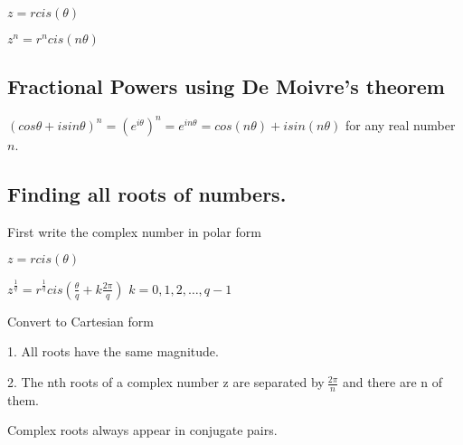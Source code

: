 \documentclass{extarticle}
\begin{document}
\begin{multicols}{4}
$z=rcis\left(\theta\right)$

$z^n=r^ncis\left(n\theta\right)$


\subsection{Fractional Powers using De Moivre's theorem}

$\left(cos\theta+isin\theta\right)^n=\left(e^{i\theta}\right)^n=e^{in\theta}=cos\left(n\theta\right)+isin\left(n\theta\right)$
for any real number $n$.


\subsection{Finding all roots of numbers.}

First write the complex number in polar form

$z=rcis\left(\theta\right)$


$z^\frac{1}{q}=r^\frac{1}{q}cis\left(\frac{\theta}{q}+k\frac{2\pi}{q}\right)$ $k=0,1,2,\ldots,q-1$

Convert to Cartesian form

1. All roots have the same magnitude.

2. The nth roots of a complex number z are separated by$\ \frac{2\pi}{n}$ and there are n of them.

Complex roots always appear in conjugate pairs.




\end{multicols}
\end{document}
